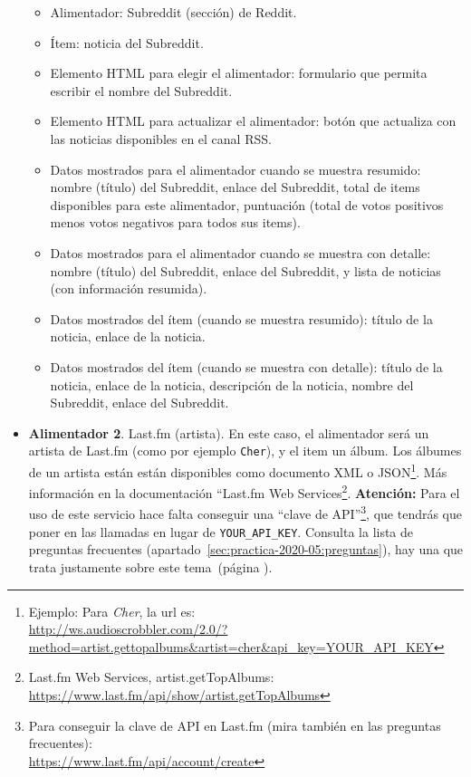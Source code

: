 \begin{itemize}
  \begin{itemize}
  \item Alimentador: Subreddit (sección) de Reddit.
  \item Ítem: noticia del Subreddit.
  \item Elemento HTML para elegir el alimentador: formulario que permita escribir el nombre del Subreddit.
  \item Elemento HTML para actualizar el alimentador: botón que actualiza con las noticias disponibles en el canal RSS.
  \item Datos mostrados para el alimentador cuando se muestra resumido: nombre (título) del Subreddit, enlace del Subreddit, total de items disponibles para este alimentador, puntuación (total de votos positivos menos votos negativos para todos sus items).
  \item Datos mostrados para el alimentador cuando se muestra con detalle: nombre (título) del Subreddit, enlace del Subreddit, y lista de noticias (con información resumida).
  \item Datos mostrados del ítem (cuando se muestra resumido): título de la noticia, enlace de la noticia.
  \item Datos mostrados del ítem (cuando se muestra con detalle): título de la noticia, enlace de la noticia, descripción de la noticia, nombre del Subreddit, enlace del Subreddit.
  \end{itemize}

\item \textbf{Alimentador 2}. Last.fm (artista). En este caso, el alimentador será un artista de Last.fm (como por ejemplo \verb|Cher|), y el item un álbum. Los álbumes de un artista están están disponibles como documento XML o JSON\footnote{Ejemplo: Para \emph{Cher}, la url es:\\ \url{http://ws.audioscrobbler.com/2.0/?method=artist.gettopalbums&artist=cher&api_key=YOUR_API_KEY}}. Más información en la documentación ``Last.fm Web Services\footnote{Last.fm Web Services, artist.getTopAlbums: \\ \url{https://www.last.fm/api/show/artist.getTopAlbums}}. \textbf{Atención:} Para el uso de este servicio hace falta conseguir una ``clave de API''\footnote{Para conseguir la clave de API en Last.fm (mira también en las preguntas frecuentes): \\\url{https://www.last.fm/api/account/create}}, que tendrás que poner en las llamadas en lugar de \verb|YOUR_API_KEY|. Consulta la lista de preguntas frecuentes (apartado~\ref{sec:practica-2020-05:preguntas}), hay una que trata justamente sobre este tema~(página \pageref{sec:practica-2020-05:preguntas-apikey}).


\end{itemize}
